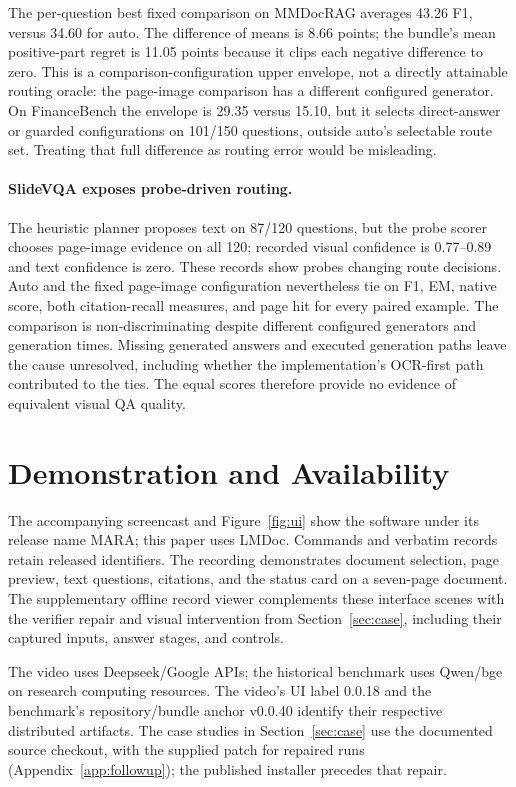 The per-question best fixed comparison on MMDocRAG averages 43.26 F1, versus 34.60 for auto. The difference of means is 8.66 points; the bundle's mean positive-part regret is 11.05 points because it clips each negative difference to zero. This is a comparison-configuration upper envelope, not a directly attainable routing oracle: the page-image comparison has a different configured generator. On FinanceBench the envelope is 29.35 versus 15.10, but it selects direct-answer or guarded configurations on 101/150 questions, outside auto's selectable route set. Treating that full difference as routing error would be misleading.

\paragraph{SlideVQA exposes probe-driven routing.}
The heuristic planner proposes text on 87/120 questions, but the probe scorer chooses page-image evidence on all 120; recorded visual confidence is 0.77--0.89 and text confidence is zero. These records show probes changing route decisions. Auto and the fixed page-image configuration nevertheless tie on F1, EM, native score, both citation-recall measures, and page hit for every paired example. The comparison is non-discriminating despite different configured generators and generation times. Missing generated answers and executed generation paths leave the cause unresolved, including whether the implementation's OCR-first path contributed to the ties. The equal scores therefore provide no evidence of equivalent visual QA quality.



\section{Demonstration and Availability}
\label{sec:demo}
The accompanying screencast and Figure~\ref{fig:ui} show the software under its release name MARA; this paper uses LMDoc. Commands and verbatim records retain released identifiers. The recording demonstrates document selection, page preview, text questions, citations, and the status card on a seven-page document. The supplementary offline record viewer complements these interface scenes with the verifier repair and visual intervention from Section~\ref{sec:case}, including their captured inputs, answer stages, and controls.

The video uses Deepseek/Google APIs; the historical benchmark uses Qwen/bge on research computing resources. The video's UI label 0.0.18 and the benchmark's repository/bundle anchor v0.0.40 identify their respective distributed artifacts. The case studies in Section~\ref{sec:case} use the documented source checkout, with the supplied patch for repaired runs (Appendix~\ref{app:followup}); the published installer precedes that repair.

